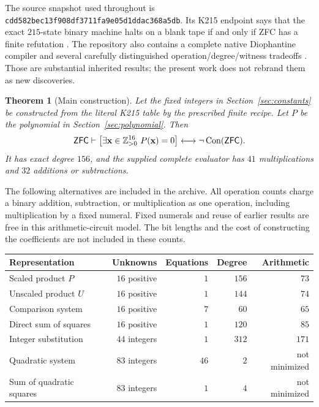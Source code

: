 \documentclass[11pt]{article}
\newtheorem{theorem}{Theorem}[section]
\theoremstyle{remark}\newtheorem{remark}[theorem]{Remark}
\newcommand{\Con}{\operatorname{Con}}\newcommand{\ZFC}{\mathsf{ZFC}}
\newcommand{\snap}{\texttt{cdd582bec13f908df3711fa9e05d1ddac368a5db}}
\begin{document}
The source snapshot used throughout is \snap. Its K215 endpoint says
that the exact $215$-state binary machine halts on a blank tape if and
only if ZFC has a finite refutation \cite{K215,Endpoint}. The repository
also contains a complete native Diophantine compiler and several
carefully distinguished operation/degree/witness tradeoffs
\cite{Raw75,Compiler75,Bezout85,Scaled84}. Those are substantial inherited
results; the present work does not rebrand them as new discoveries.

\begin{theorem}[Main construction]\label{thm:main}
Let the fixed integers in Section~\ref{sec:constants} be constructed from
the literal K215 table by the prescribed finite recipe. Let $P$ be the
polynomial in Section~\ref{sec:polynomial}. Then
\[
 \ZFC\vdash
 \left[\exists\mathbf x\in\pos^{16}\ P(\mathbf x)=0\right]
 \longleftrightarrow\neg\Con(\ZFC).
\]
It has exact degree $156$, and the supplied complete evaluator has
$41$ multiplications and $32$ additions or subtractions.
\end{theorem}

The following alternatives are included in the archive. All operation
counts charge a binary addition, subtraction, or multiplication as one
operation, including multiplication by a fixed numeral. Fixed numerals
and reuse of earlier results are free in this arithmetic-circuit model.
The bit lengths and the cost of constructing the coefficients are not
included in these counts.

\begin{center}
\small
\begin{tabular}{@{}lrrrr@{}}
\toprule
Representation & Unknowns & Equations & Degree & Arithmetic\\
\midrule
Scaled product $P$ & $16$ positive & $1$ & $156$ & $73$\\
Unscaled product $U$ & $16$ positive & $1$ & $144$ & $74$\\
Comparison system & $16$ positive & $7$ & $60$ & $65$\\
Direct sum of squares & $16$ positive & $1$ & $120$ & $85$\\
Integer substitution & $44$ integers & $1$ & $312$ & $171$\\
Quadratic system & $83$ integers & $46$ & $2$ & not minimized\\
Sum of quadratic squares & $83$ integers & $1$ & $4$ & not minimized\\
\bottomrule
\end{tabular}
\end{center}
\end{document}
